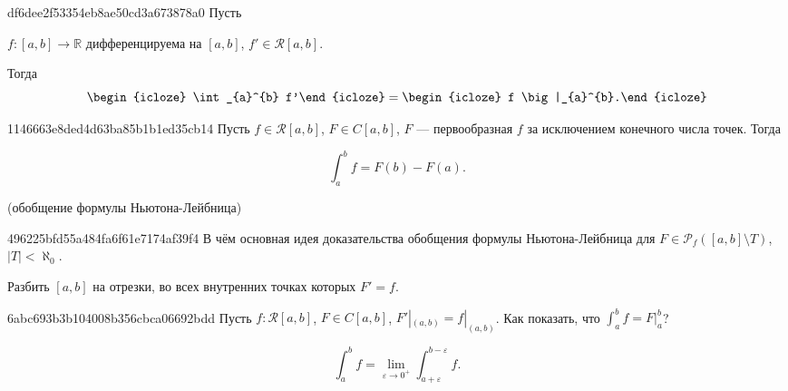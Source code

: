 \begin{note}{df6dee2f53354eb8ae50cd3a673878a0}
    Пусть \begin{icloze}{3}\({ f : [a, b] \to \mathbb R }\) дифференцируема на \({ [a, b] }\), \({ f' \in \mathcal R[a, b] }\).\end{icloze} Тогда
    \[
        \begin{icloze}{2}\int_{a}^{b} f'\end{icloze} = \begin{icloze}{1}f \big|_{a}^{b}.\end{icloze}
    \]
\end{note}

\begin{note}{1146663e8ded4d63ba85b1b1ed35cb14}
    Пусть \({ f \in \mathcal R[a, b] }\), \({ F \in C[a, b] }\), \({ F }\) --- первообразная \({ f }\) за исключением конечного числа точек.
    Тогда
    \begin{icloze}{1}
        \[
            \int_{a}^{b} f = F(b) - F(a).
        \]
    \end{icloze}

    \begin{center}
        \tiny
        (обобщение формулы Ньютона-Лейбница)
    \end{center}
\end{note}

\begin{note}{496225bfd55a484fa6f61e7174af39f4}
    В чём основная идея доказательства обобщения формулы Ньютона-Лейбница для \({ F \in \mathscr P_f ([a, b] \setminus T) }\),\: \({ |T| < \aleph_0 }\).

    \begin{cloze}{1}
        Разбить \({ [a, b] }\) на отрезки, во всех внутренних точках которых \({ F' = f }\).
    \end{cloze}
\end{note}

\begin{note}{6abc693b3b104008b356cbca06692bdd}
    Пусть \({ f : \mathcal R[a, b] }\), \({ F \in C[a, b] }\), \({ F'|_{(a, b)} = f|_{(a, b)} }\).
    Как показать, что \({ \int_{a}^{b} f = F\big|_{a}^{b} }\)?

    \begin{cloze}{1}
        \[
            \int_{a}^{b} f  = \lim_{\varepsilon \to 0^{+}} \int_{a + \varepsilon}^{b - \varepsilon} f.
        \]
    \end{cloze}
\end{note}

